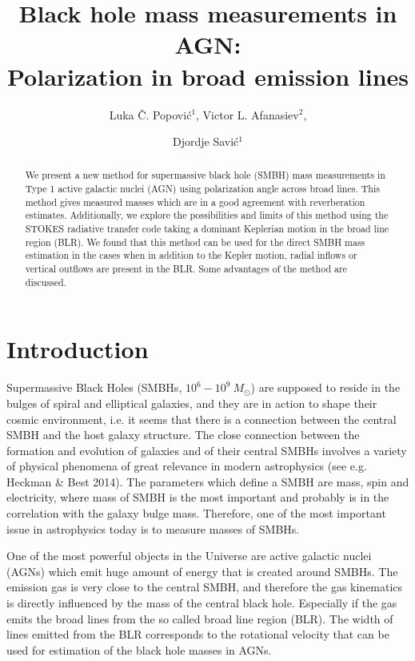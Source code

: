 \documentclass{iau}
\title[IAUS342: Black hole mass measurements in AGN] %
{Black hole mass measurements in AGN: \\ Polarization in broad emission lines}
\author[Popovi\'c et al.]   %
{Luka \v C. Popovi\'c$^1$, Victor L. Afanasiev$^2$, \and Djordje Savi\'c$^1$
 }
\affiliation{$^1$
Astronomical Observatory,  11160 Belgrade, Serbia,
\\ email: {\tt lpopovic@aob.rs; djsavic@aob.rs} \\[\affilskip]
$^2$Special Astrophysical Observatory of the Russian AS,\\ Nizhnij Arkhyz, 
Karachaevo-Cherkesia 369167, Russia
\\email: {\tt vafan@sao.ru}}
\begin{document}
\maketitle

\begin{abstract}
We present a new method for supermassive black hole (SMBH) mass measurements in Type 1 active 
galactic nuclei (AGN) using polarization angle across broad lines. 
This method gives measured masses which are in a good agreement with reverberation 
estimates. Additionally, we explore the possibilities and limits of 
this method using the STOKES radiative transfer code taking 
a dominant Keplerian motion in the broad line region (BLR). 
We found that this method can be used for 
the direct SMBH mass estimation in the cases when in addition to the Kepler motion,
radial inflows or 
vertical outflows are present in the BLR. Some advantages of the method are discussed.
\end{abstract}

\firstsection %
\section{Introduction}

Supermassive Black Holes (SMBHs, $10^6-10^9\ M_\odot$) are supposed to reside  in 
the bulges of spiral and elliptical galaxies, and they are in action to shape 
their cosmic environment, i.e. it seems that there is a connection between the central SMBH and 
the host galaxy structure. The close 
connection between the formation and evolution of galaxies and of their central SMBHs involves a 
variety of physical phenomena of great relevance in modern astrophysics (see e.g. Heckman
\& Best 2014).
The parameters which define a SMBH are mass, spin and electricity, where 
mass of SMBH is the most important and probably is in the correlation with the galaxy bulge mass.
Therefore,  one of the most important
issue in astrophysics today is to measure masses of SMBHs.

One of the most powerful objects in the Universe are active galactic nuclei (AGNs) which emit
huge amount of  energy that is created around SMBHs. The emission gas is very close to the 
central SMBH, and therefore the gas kinematics is directly influenced by the mass of the 
central black hole. Especially if the gas emits  the broad lines from the so called 
broad line region (BLR).  The width of 
lines emitted from the BLR corresponds to the rotational velocity
that can be used for estimation of the 
black hole masses in AGNs.
\end{document}

